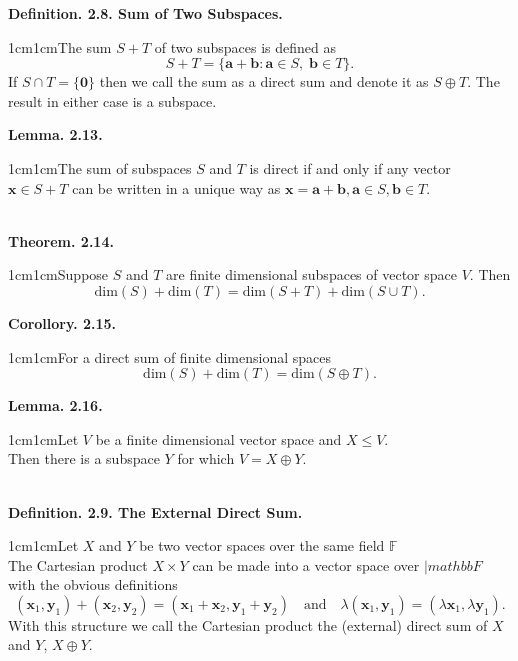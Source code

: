 \documentclass{article}
\newcommand{\vect}[1]{\mathbf{#1}}
\newcommand{\definition}[2]{\textbf{Definition. #1.}\begin{adjustwidth}{1cm}{1cm}#2\end{adjustwidth}}
\newcommand{\theorem}[2]{\textbf{Theorem. #1.}\begin{adjustwidth}{1cm}{1cm}#2\end{adjustwidth}}
\newcommand{\lemma}[2]{\textbf{Lemma. #1.}\begin{adjustwidth}{1cm}{1cm}#2\end{adjustwidth}}
\newcommand{\corrollory}[2]{\textbf{Corollory. #1.}\begin{adjustwidth}{1cm}{1cm}#2\end{adjustwidth}}
\begin{document}
\definition{2.8. Sum of Two Subspaces}{The sum $S + T$ of two subspaces is defined as \[S + T = \{ \vect{a} + \vect{b} : \vect{a} \in S, \; \vect{b} \in T \}.\]If $S \cap T = \{ \vect{0} \}$ then we call the sum as a direct sum and denote it as $S \oplus T$. The result in either case is a subspace.}\newpage
\lemma{2.13}{The sum of subspaces $S$ and $T$ is direct if and only if any vector $\vect{x} \in S + T$ can be written in a unique way as $\vect{x} = \vect{a} + \vect{b}, \vect{a} \in S, \vect{b} \in T$.}~\\
\theorem{2.14}{Suppose $S$ and $T$ are finite dimensional subspaces of vector space $V$. Then \[\text{dim}(S) + \text{dim}(T) = \text{dim}(S+T) + \text{dim}(S \cup T).\]}
\corrollory{2.15}{For a direct sum of finite dimensional spaces \[\text{dim}(S) + \text{dim}(T) = \text{dim}(S \oplus T).\]}
\lemma{2.16}{Let $V$ be a finite dimensional vector space and $X \leq V$.\\Then there is a subspace $Y$ for which $V = X \oplus Y$.}~\\
\definition{2.9. The External Direct Sum}{Let $X$ and $Y$ be two vector spaces over the same field $\mathbb{F}$\\The Cartesian product $X \times Y$ can be made into a vector space over $|mathbb{F}$ with the obvious definitions \[(\vect{x}_1,\vect{y}_1)+(\vect{x}_2,\vect{y}_2)=(\vect{x}_1+\vect{x}_2,\vect{y}_1+\vect{y}_2) \quad \text{and} \quad \lambda(\vect{x}_1,\vect{y}_1)=(\lambda \vect{x}_1,\lambda \vect{y}_1).\]With this structure we call the Cartesian product the (external) direct sum of $X$ and $Y$, $X \oplus Y$.}
\end{document}
